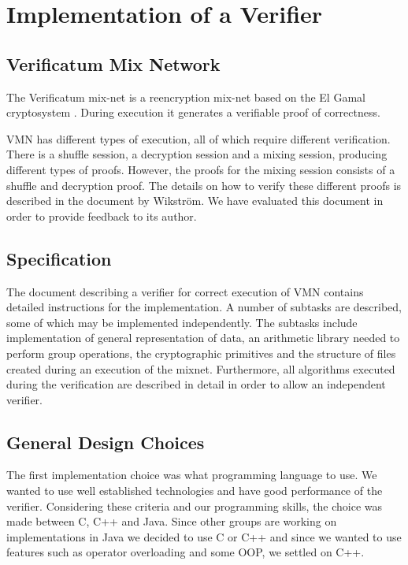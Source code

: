 \section{Implementation of a Verifier}

\subsection{Verificatum Mix Network}

The Verificatum mix-net is a reencryption mix-net based on the El
Gamal cryptosystem \cite[p.~1]{wikstrom1}. During execution it
generates a verifiable proof of correctness.

VMN has different types of execution, all of which require different
verification. There is a shuffle session, a decryption session and a
mixing session, producing different types of proofs. However, the
proofs for the mixing session consists of a shuffle and decryption
proof. The details on how to verify these different proofs is
described in the document \cite{wikstrom1} by Wikström. We have
evaluated this document in order to provide feedback to its author.

\subsection{Specification}

The document \cite{wikstrom1} describing a verifier for correct
execution of VMN contains detailed instructions for the
implementation. A number of subtasks are described, some of which may
be implemented independently. The subtasks include implementation of
general representation of data, an arithmetic library needed to
perform group operations, the cryptographic primitives and the
structure of files created during an execution of the
mixnet. Furthermore, all algorithms executed during the verification
are described in detail in order to allow an independent verifier.

\subsection{General Design Choices}

The first implementation choice was what programming language to
use. We wanted to use well established technologies and have good
performance of the verifier. Considering these criteria and our
programming skills, the choice was made between C, C++ and Java. Since
other groups are working on implementations in Java we decided to use
C or C++ and since we wanted to use features such as operator
overloading and some OOP, we settled on C++.

